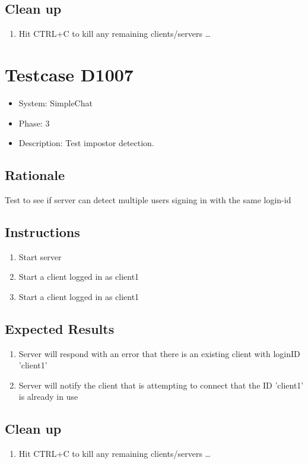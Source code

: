 \documentclass[12pt]{article}
\begin{document}
\subsection*{Clean up}
\begin{enumerate}
\item Hit CTRL+C to kill any remaining clients/servers \dots
\end{enumerate}

\section{Testcase D1007}
\begin{itemize}
\item System: SimpleChat
\item Phase: 3
\item Description: Test impostor detection.
\end{itemize}

\subsection*{Rationale}
Test to see if server can detect multiple users signing in with the same login-id

\subsection*{Instructions}
\begin{enumerate}
\item Start server
\item Start a client logged in as client1
\item Start a client logged in as client1
\end{enumerate}

\subsection*{Expected Results}
\begin{enumerate}
\item Server will respond with an error that there is an existing client with loginID 'client1'
\item Server will notify the client that is attempting to connect that the ID 'client1' is already in use
\end{enumerate}

\subsection*{Clean up}
\begin{enumerate}
\item Hit CTRL+C to kill any remaining clients/servers \dots
\end{enumerate}
\end{document}
